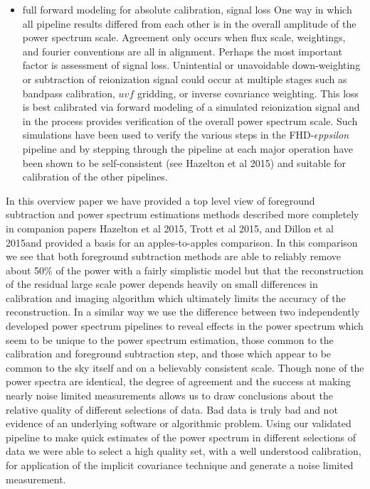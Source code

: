 \documentclass[preprint]{aastex}
\def\eppsilon{{\it $\epsilon$ppsilon }}
\def\chipscite{Trott et al 2015}
\def\eppsiloncite{Hazelton et al 2015}
\def\dilloncite{Dillon et al 2015}
\begin{document}
\begin{itemize}
\item full forward modeling for absolute calibration, signal loss
One way in which all pipeline results differed from each other is in the overall amplitude of the power spectrum scale. Agreement only occurs when flux scale, weightings, and fourier conventions are all in alignment.  Perhaps the most important factor is assessment of signal loss.  Unintential or unavoidable down-weighting or subtraction of reionization signal could occur at multiple stages such as bandpass calibration, $uvf$ gridding, or inverse covariance weighting. This loss is best calibrated via forward modeling of a simulated reionization signal and in the process provides verification of the overall power spectrum scale.  Such simulations have been used to verify the various steps in the FHD-\eppsilon pipeline and by stepping through the pipeline at each major operation have been shown to be self-consistent (see \eppsiloncite) and suitable for calibration of the other pipelines.
\end{itemize}

In this overview paper we have provided a top level view of foreground subtraction and power spectrum estimations methods described more completely in companion papers \eppsiloncite, \chipscite, and \dilloncite and provided a basis for an apples-to-apples comparison.  In this comparison we see that both foreground subtraction methods are able to reliably remove about 50\% of the power with a fairly simplistic model but that the reconstruction of the residual large scale power depends heavily on small differences in calibration and imaging algorithm which ultimately limits the accuracy of the reconstruction.  In a similar way we use the difference between two independently developed power spectrum pipelines to reveal effects in the power spectrum which seem to be unique to the power spectrum estimation, those common to the calibration and foreground subtraction step, and those which appear to be common to the sky itself and on a believably consistent scale.  Though none of the power spectra are identical, the degree of agreement and the success at making nearly noise limited measurements allows us to draw conclusions about the relative quality of different selections of data.  Bad data is truly bad and not evidence of an underlying software or algorithmic problem.  Using our validated pipeline to make quick estimates of the power spectrum in different selections of data we were able to select a high quality set, with a well understood calibration, for application of the implicit covariance technique and generate a noise limited measurement. 
\end{document}
